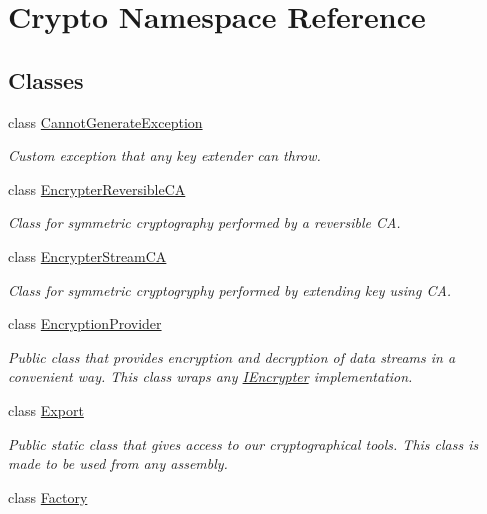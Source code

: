 \hypertarget{namespace_crypto}{}\section{Crypto Namespace Reference}
\label{namespace_crypto}
\subsection*{Classes}
\begin{DoxyCompactItemize}
\item 
class \hyperlink{class_crypto_1_1_cannot_generate_exception}{Cannot\+Generate\+Exception}
\begin{DoxyCompactList}\small\item\em Custom exception that any key extender can throw. \end{DoxyCompactList}\item 
class \hyperlink{class_crypto_1_1_encrypter_reversible_c_a}{Encrypter\+Reversible\+C\+A}
\begin{DoxyCompactList}\small\item\em Class for symmetric cryptography performed by a reversible C\+A. \end{DoxyCompactList}\item 
class \hyperlink{class_crypto_1_1_encrypter_stream_c_a}{Encrypter\+Stream\+C\+A}
\begin{DoxyCompactList}\small\item\em Class for symmetric cryptogryphy performed by extending key using C\+A. \end{DoxyCompactList}\item 
class \hyperlink{class_crypto_1_1_encryption_provider}{Encryption\+Provider}
\begin{DoxyCompactList}\small\item\em Public class that provides encryption and decryption of data streams in a convenient way. This class wraps any {\ttfamily \hyperlink{interface_crypto_1_1_i_encrypter}{I\+Encrypter}} implementation. \end{DoxyCompactList}\item 
class \hyperlink{class_crypto_1_1_export}{Export}
\begin{DoxyCompactList}\small\item\em Public static class that gives access to our cryptographical tools. This class is made to be used from any assembly. \end{DoxyCompactList}\item 
class \hyperlink{class_crypto_1_1_factory}{Factory}

\end{DoxyCompactItemize}
